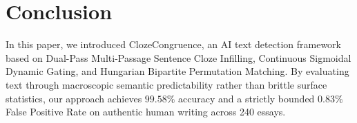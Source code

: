 \documentclass[conference]{IEEEtran}
\begin{document}
\section{Conclusion}
In this paper, we introduced ClozeCongruence, an AI text detection framework based on Dual-Pass Multi-Passage Sentence Cloze Infilling, Continuous Sigmoidal Dynamic Gating, and Hungarian Bipartite Permutation Matching. By evaluating text through macroscopic semantic predictability rather than brittle surface statistics, our approach achieves $99.58\%$ accuracy and a strictly bounded $0.83\%$ False Positive Rate on authentic human writing across 240 essays.



\end{document}

